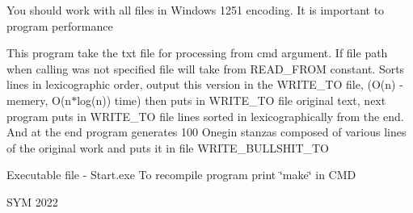 You should work with all files in Windows 1251 encoding. It is important to program performance

This program take the txt file for processing from cmd argument. If file path when calling was not specified file will take from READ\+\_\+\+FROM constant. Sorts lines in lexicographic order, output this version in the WRITE\+\_\+\+TO file, (O(n) -\/ memery, O(n$\ast$log(n)) time) then puts in WRITE\+\_\+\+TO file original text, next program puts in WRITE\+\_\+\+TO file lines sorted in lexicographically from the end. And at the end program generates 100 Onegin stanzas composed of various lines of the original work and puts it in file WRITE\+\_\+\+BULLSHIT\+\_\+\+TO

Executable file -\/ Start.\+exe To recompile program print \char`\"{}make\char`\"{} in CMD

SYM 2022 
